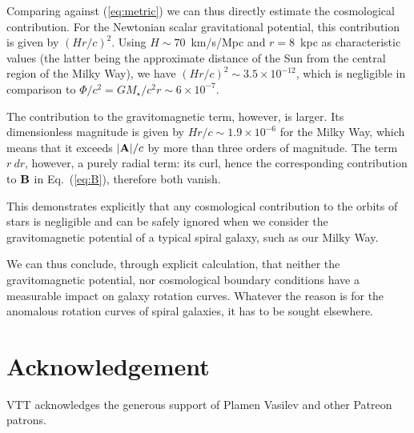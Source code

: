 \documentclass{ws-ijmpd}
\begin{document}
Comparing against (\ref{eq:metric}) we can thus directly estimate the cosmological contribution. For the Newtonian scalar gravitational potential, this contribution is given by $(Hr/c)^2$. Using $H\sim 70$~km/s/Mpc and $r=8$~kpc as characteristic values (the latter being the approximate distance of the Sun from the central region of the Milky Way), we have $(Hr/c)^2\sim 3.5\times 10^{-12}$, which is negligible in comparison to $\Phi/c^2=GM_\star/c^2r\sim 6\times 10^{-7}$.

The contribution to the gravitomagnetic term, however, is larger. Its dimensionless magnitude is given by $Hr/c\sim 1.9\times 10^{-6}$ for the Milky Way, which means that it exceeds $|{\bf A}|/c$ by more than three orders of magnitude. The term $r~dr$, however, a purely radial term: its curl, hence the corresponding contribution to ${\bf B}$ in Eq.~(\ref{eq:B}), therefore both vanish.

This demonstrates explicitly that any cosmological contribution to the orbits of stars is negligible and can be safely ignored when we consider the gravitomagnetic potential of a typical spiral galaxy, such as our Milky Way.

We can thus conclude, through explicit calculation, that neither the gravitomagnetic potential, nor cosmological boundary conditions have a measurable impact on galaxy rotation curves. Whatever the reason is for the anomalous rotation curves of spiral galaxies, it has to be sought elsewhere.

\section*{Acknowledgement}

VTT acknowledges the generous support of Plamen Vasilev and other Patreon patrons.





\end{document}
